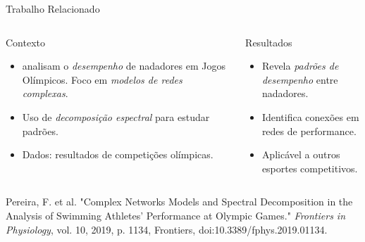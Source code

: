 \begin{frame}{Trabalho Relacionado}
    \begin{columns}[T]
        \begin{block}{Contexto}
            \begin{itemize}
                \item \cite{buldu2019complex} analisam o \textit{desempenho} de nadadores em Jogos Olímpicos.
 Foco em \textit{modelos de redes complexas}.
                \item Uso de \textit{decomposição espectral} para estudar padrões.
                \item Dados: resultados de competições olímpicas.
            \end{itemize}
        \end{block}
        
        \begin{block}{Resultados}
            \begin{itemize}
                \item Revela \textit{padrões de desempenho} entre nadadores.
                \item Identifica conexões em redes de performance.
                \item Aplicável a outros esportes competitivos.
            \end{itemize}
        \end{block}
    \end{columns}
    
    \vspace{0.3cm}
    \small{Pereira, F. et al. "Complex Networks Models and Spectral Decomposition in the Analysis of Swimming Athletes’ Performance at Olympic Games." \textit{Frontiers in Physiology}, vol. 10, 2019, p. 1134, Frontiers, doi:10.3389/fphys.2019.01134.}
\end{frame}